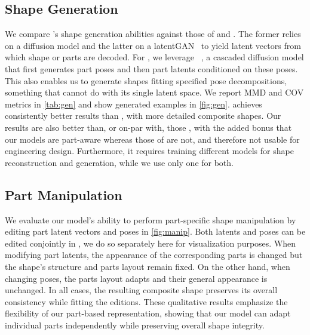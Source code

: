 \subsection{Shape Generation}
\label{sec:exp-gen}





We compare \PSDF{}'s shape generation abilities against those of \VecSet{} and \PQNET{}. The former relies on a diffusion model and the latter on a latentGAN~\cite{Achlioptas18b} to yield latent vectors from which shape or parts are decoded.
For \PSDF{}, we leverage \SALAD~\cite{Koo23}, a cascaded diffusion model that first generates part poses and then part latents conditioned on these poses. This also enables us to generate shapes fitting specified pose decompositions, something that \PQNET{} cannot do with its single latent space. We report MMD and COV metrics in \cref{tab:gen} and show generated examples in \cref{fig:gen}. \PSDF{} achieves consistently better results than \PQNET{}, with more detailed composite shapes. 
%
Our results are also  better than, or on-par with, those \VecSet{}, with the added bonus that our models are part-aware whereas those of  \VecSet{} are not, and therefore not usable for engineering design. Furthermore, it  requires training different models for shape reconstruction and generation, while we use only one for both.




\subsection{Part Manipulation}
\label{sec:exp-manip}

We evaluate our model’s ability to perform part-specific shape manipulation by editing part latent vectors and poses in \cref{fig:manip}. Both latents and poses can be edited conjointly in \PSDF{}, we do so separately here for visualization purposes.
When modifying part latents, the appearance of the corresponding parts is changed but the shape's structure and parts layout remain fixed. On the other hand, when changing poses, the parts layout adapts and their general appearance is unchanged. In all cases, the resulting composite shape preserves its overall consistency while fitting the editions.
%
These qualitative results emphasize the flexibility of our part-based representation, showing that our model can adapt individual parts independently while preserving overall shape integrity.

